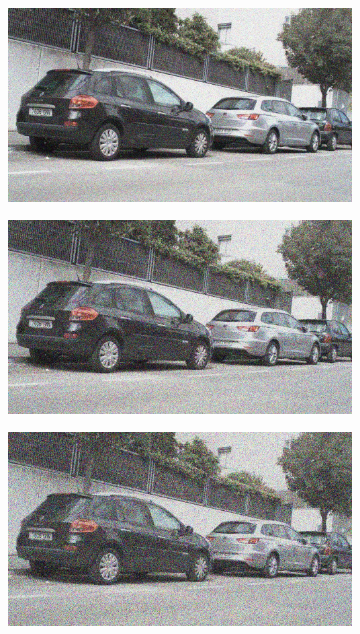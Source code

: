 \documentclass[a4paper]{ctexart}
\begin{document}
\begin{figure}[htbp]
\begin{subfigure}{0.08\textwidth}
				\label{fig：Gamma=0.9, Gauss Noise = 0.1}
			\end{subfigure}
			\begin{subfigure}{0.08\textwidth}
				\captionsetup{font=scriptsize}
				\includegraphics[width=\linewidth]{picture/Edge Detection/degrade/RGB_001 Gamma=0.9, Gauss Noise=0.2}
				\label{fig：Gamma=0.9, Gauss Noise = 0.2}
			\end{subfigure}
			\begin{subfigure}{0.08\textwidth}
				\captionsetup{font=scriptsize}
				\includegraphics[width=\linewidth]{picture/Edge Detection/degrade/RGB_001 Gamma=0.9, Gauss Noise=0.3}
				\label{fig：Gamma=0.9, Gauss Noise = 0.3}
			\end{subfigure}
			\begin{subfigure}{0.08\textwidth}
				\captionsetup{font=scriptsize}
				\includegraphics[width=\linewidth]{picture/Edge Detection/degrade/RGB_001 Gamma=0.9, Gauss Noise=0.4}

\end{subfigure}
\end{figure}
\end{document}
